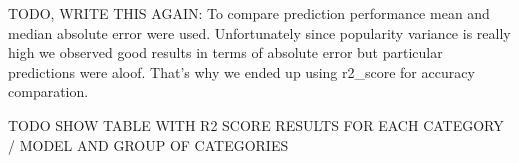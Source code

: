 TODO, WRITE THIS AGAIN:
To compare prediction performance mean and median absolute error were used. Unfortunately since popularity variance is really high we observed good results in terms of absolute error but particular predictions were aloof. That's why we ended up using r2\_score for accuracy comparation. 

TODO SHOW TABLE WITH R2 SCORE RESULTS FOR EACH CATEGORY / MODEL AND GROUP OF CATEGORIES




